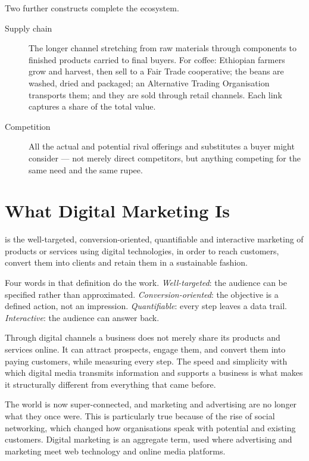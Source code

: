 \documentclass{MMTextbook}
\begin{document}
Two further constructs complete the ecosystem.

\begin{description}
\item[Supply chain] The longer channel stretching from raw materials through
components to finished products carried to final buyers. For coffee: Ethiopian
farmers grow and harvest, then sell to a Fair Trade cooperative; the beans are
washed, dried and packaged; an Alternative Trading Organisation transports them;
and they are sold through retail channels. Each link captures a share of the
total value.
\item[Competition] All the actual and potential rival offerings and substitutes
a buyer might consider --- not merely direct competitors, but anything
competing for the same need and the same rupee.
\end{description}

\section{What Digital Marketing Is}

\begin{definitionbox}
 is the well-targeted, conversion-oriented,
quantifiable and interactive marketing of products or services using digital
technologies, in order to reach customers, convert them into clients and retain
them in a sustainable fashion.
\end{definitionbox}

Four words in that definition do the work. \emph{Well-targeted}: the audience
can be specified rather than approximated. \emph{Conversion-oriented}: the
objective is a defined action, not an impression. \emph{Quantifiable}: every
step leaves a data trail. \emph{Interactive}: the audience can answer back.

Through digital channels a business does not merely share its products and
services online. It can attract prospects, engage them, and convert them into
paying customers, while measuring every step. The speed and simplicity with
which digital media transmits information and supports a business is what makes
it structurally different from everything that came before.

The world is now super-connected, and marketing and advertising are no longer
what they once were. This is particularly true because of the rise of social
networking, which changed how organisations speak with potential and existing
customers. Digital marketing is an aggregate term, used where advertising and
marketing meet web technology and online media platforms.
\end{document}
